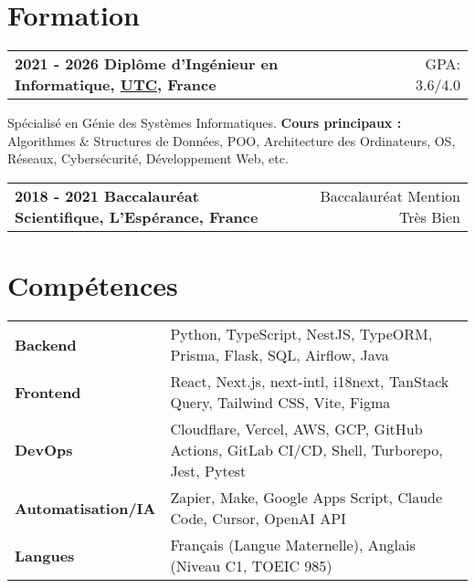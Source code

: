 \documentclass[a4paper,10pt]{article}
\makeatletter
\newenvironment{jobshort}[2]
    {
    \begin{tabularx}{\linewidth}{@{}l X r@{}}
    \textbf{#1} & \hfill &  #2 \\[2pt]
    \end{tabularx}
    } {}
\makeatother
\begin{document}
\section{Formation}

\begin{jobshort}{2021 - 2026    Diplôme d'Ingénieur en Informatique, \href{https://www.utc.fr}{UTC}, France}{GPA: 3.6/4.0}
    Spécialisé en Génie des Systèmes Informatiques. \textbf{Cours principaux :} Algorithmes \& Structures de Données, POO, Architecture des Ordinateurs, OS, Réseaux, Cybersécurité, Développement Web, etc.
\end{jobshort}

\begin{jobshort}{2018 - 2021    Baccalauréat Scientifique, L'Espérance, France}{Baccalauréat Mention Très Bien}
\end{jobshort}

\section{Compétences}

\begin{tabularx}{\linewidth}{@{}l X@{}}
    \textbf{Backend}           & \normalsize{Python, TypeScript, NestJS, TypeORM, Prisma, Flask, SQL, Airflow, Java}                     \\
    \textbf{Frontend}          & \normalsize{React, Next.js, next-intl, i18next, TanStack Query, Tailwind CSS, Vite, Figma}              \\
    \textbf{DevOps}            & \normalsize{Cloudflare, Vercel, AWS, GCP, GitHub Actions, GitLab CI/CD, Shell, Turborepo, Jest, Pytest} \\
    \textbf{Automatisation/IA} & \normalsize{Zapier, Make, Google Apps Script, Claude Code, Cursor, OpenAI API}                          \\
    \textbf{Langues}           & \normalsize{Français (Langue Maternelle), Anglais (Niveau C1, TOEIC 985)}                               \\
\end{tabularx}
\end{document}
